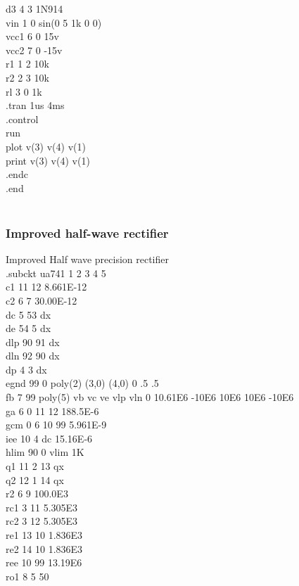 \documentclass[12pt]{article}
\begin{document}
d3 4 3 1N914\\
vin 1 0 sin(0 5 1k 0 0)\\
vcc1 6 0 15v\\
vcc2 7 0 -15v\\
r1 1 2 10k\\
r2 2 3 10k\\
rl 3 0 1k\\
.tran 1us 4ms\\  
.control\\
run\\
plot v(3) v(4) v(1)\\
print v(3) v(4) v(1)\\
.endc \\
.end\\
\newpage\\

\subsubsection{Improved half-wave rectifier}
Improved Half wave precision rectifier\\
.subckt ua741    1  2  3  4  5\\
c1   11 12 8.661E-12\\
c2    6  7 30.00E-12\\
dc    5 53 dx\\
de   54  5 dx\\
dlp  90 91 dx\\
dln  92 90 dx\\
dp    4  3 dx\\
egnd 99  0 poly(2) (3,0) (4,0) 0 .5 .5\\
fb    7 99 poly(5) vb vc ve vlp vln 0 10.61E6 -10E6 10E6 10E6 -10E6\\
ga    6  0 11 12 188.5E-6\\
gcm   0  6 10 99 5.961E-9\\
iee  10  4 dc 15.16E-6\\
hlim 90  0 vlim 1K\\
q1   11  2 13 qx\\
q2   12  1 14 qx\\
r2    6  9 100.0E3\\
rc1   3 11 5.305E3\\
rc2   3 12 5.305E3\\
re1  13 10 1.836E3\\
re2  14 10 1.836E3\\
ree  10 99 13.19E6\\
ro1   8  5 50\\
\end{document}
